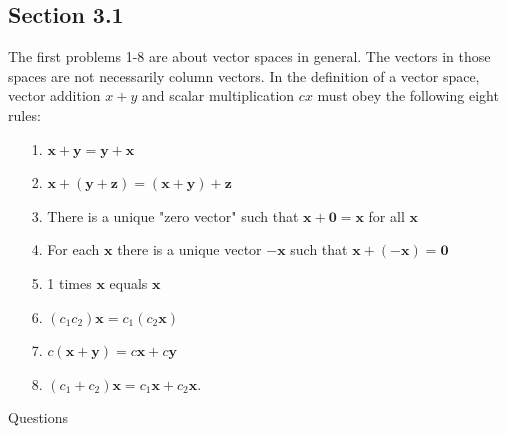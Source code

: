\documentclass[main.tex]{subfiles}
\begin{document}
\subsection{Section 3.1}

The first problems 1-8 are about vector spaces in general. The vectors in those spaces are not necessarily column vectors. In the definition of a vector space, vector addition $x+y$ and scalar multiplication $c x$ must obey the following eight rules:
\begin{enumerate}
    \item [1.] $\bm{x}+\bm{y}=\bm{y}+\bm{x}$
    \item [2.] $\bm{x}+(\bm{y}+\bm{z})=(\bm{x}+\bm{y})+\bm{z}$
    \item [3.] There is a unique "zero vector" such that $\bm{x}+\bm{0}=\bm{x}$ for all $\bm{x}$
    \item [4.] For each $\bm{x}$ there is a unique vector $-\bm{x}$ such that $\bm{x}+(-\bm{x})=\bm{0}$
    \item [5.] 1 times $\bm{x}$ equals $\bm{x}$
    \item [6.] $\left(c_{1} c_{2}\right) \bm{x}=c_{1}\left(c_{2} \bm{x}\right)$
    \item [7.] $c(\bm{x}+\bm{y})=c \bm{x}+c \bm{y}$
    \item [8.] $\left(c_{1}+c_{2}\right) \bm{x}=c_{1} \bm{x}+c_{2} \bm{x}$.
\end{enumerate}

Questions
\end{document}
